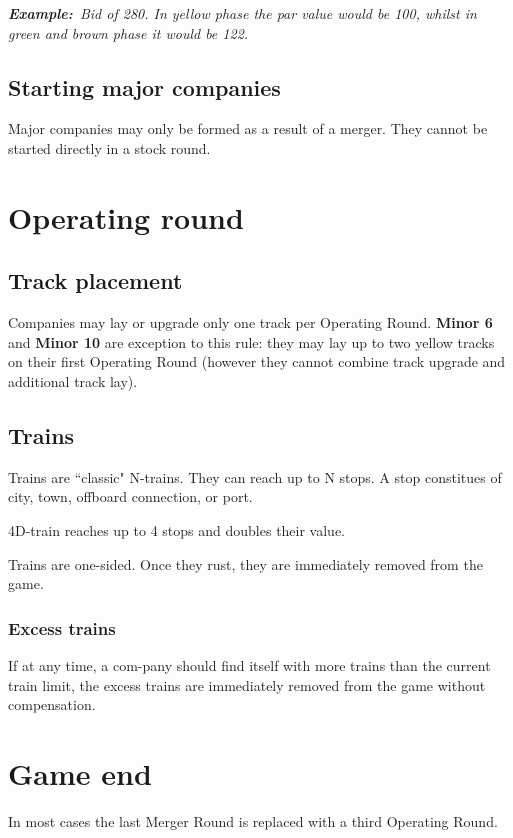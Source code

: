 \documentclass[10pt,a4paper,twocolumn]{article}
\newcommand{\Example}{\textbf{Example:}}
\begin{document}
\textit{\Example~Bid of 280. In yellow phase the par value would be 100, whilst in green and brown phase it would be 122.}

\subsection{Starting major companies}
Major companies may only be formed as a result of a merger. They cannot be started directly in a stock round.


\section{Operating round}

\subsection{Track placement}
Companies may lay or upgrade only one track per Operating Round. \textbf{Minor 6} and \textbf{Minor 10} are exception to this rule: they may lay up to two yellow tracks on their first Operating Round (however they cannot combine track upgrade and additional track lay).


\subsection{Trains}
Trains are ``classic" N-trains. They can reach up to N stops. A stop constitues of city, town, offboard connection, or port.

4D-train reaches up to 4 stops and doubles their value.

Trains are one-sided. Once they rust, they are immediately removed from the game.

\subsubsection{Excess trains}

If at any time, a com-pany  should  find  itself with  more  trains  than  the  current train limit, the excess trains are immediately removed from the game  without  compensation.


\section{Game end}

In most cases the last Merger Round is replaced with a third Operating Round.
\end{document}
